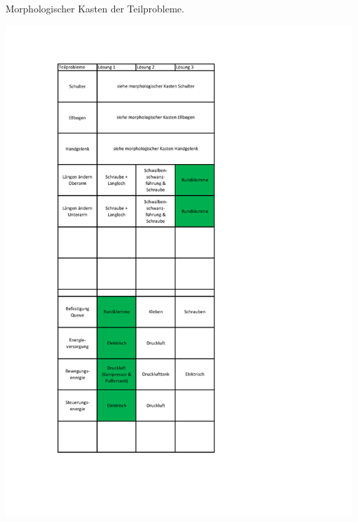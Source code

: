 	\begin{table}[h]
		\centering
		\caption[Morphologischer Kasten der Teilprobleme]{Morphologischer Kasten der Teilprobleme.}
		\centering
		\includegraphics[width=\textwidth]{Abb/Morphologischer_Kasten_Teilprobleme}
		\label{fig:morphologische-kasten-teilprobleme}
	\end{table}

